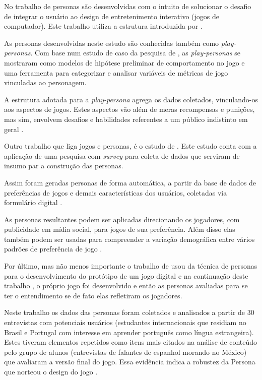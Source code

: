 No trabalho de  personas são desenvolvidas com o intuito de solucionar o desafio de integrar o usuário ao design de entretenimento interativo (jogos de computador). Este trabalho utiliza a estrutura introduzida por .

As personas desenvolvidas neste estudo são conhecidas também como \textit{play-personas}. Com base num estudo de caso da pesquisa de , as \textit{play-personas} se mostraram como modelos de hipótese preliminar de comportamento no jogo e uma ferramenta para categorizar e analisar variáveis de métricas de jogo vinculadas ao personagem.

A estrutura adotada para a \textit{play-persona} agrega os dados coletados, vinculando-os aos aspectos de jogos. Estes aspectos vão além de meras recompensas e punições, mas sim, envolvem desafios e habilidades referentes a um público indistinto em geral \cite{canossa-2009}.

Outro trabalho que liga jogos e personas, é o estudo de . Este estudo conta com a aplicação de uma pesquisa com \textit{survey} para coleta de dados que serviram de insumo par a construção das personas. 

Assim foram geradas personas de forma automática, a partir da base de dados de preferências de jogos e demais características dos usuários, coletadas via formulário digital \cite{salminen-2020}.

As personas resultantes podem ser aplicadas direcionando os jogadores, com publicidade em mídia social, para jogos de sua preferência. Além disso elas também podem ser usadas para compreender a variação demográfica entre vários padrões de preferência de jogo \cite{salminen-2020}.

Por último, mas não menos importante o trabalho de  usou da técnica de personas para o desenvolvimento do protótipo de um jogo digital e na continuação deste trabalho \cite{Salomao_2016}, o próprio jogo foi desenvolvido e então as personas avaliadas para se ter o entendimento se de fato elas refletiram os jogadores.

Neste trabalho \cite{Salomao_2015} os dados das personas foram coletados e analisados a partir de 30 entrevistas com potenciais usuários (estudantes internacionais que residiam no Brasil e Portugal com interesse em aprender português como língua estrangeira). Estes tiveram elementos repetidos como itens mais citados na análise de conteúdo pelo grupo de alunos (entrevistas de falantes de espanhol morando no México) que avaliaram a versão final do jogo. Essa evidência indica a robustez da Persona que norteou o design do jogo \cite{Salomao_2016}.

